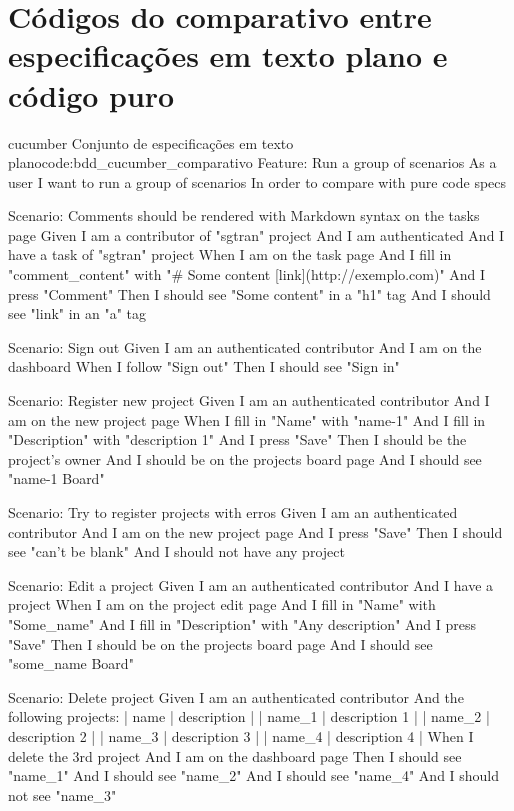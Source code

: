 \chapter{Códigos do comparativo entre especificações em texto plano e código puro} %
\label{cha:codigo_do_comparativo}

\begin{mycode}{cucumber}%
{Conjunto de especificações em texto plano}{code:bdd_cucumber_comparativo}
Feature: Run a group of scenarios
  As a user
  I want to run a group of scenarios
  In order to compare with pure code specs

  Scenario: Comments should be rendered with Markdown syntax on the tasks page
    Given I am a contributor of "sgtran" project
    And I am authenticated
    And I have a task of "sgtran" project
    When I am on the task page
    And I fill in "comment_content" with "# Some content [link](http://exemplo.com)"
    And I press "Comment"
    Then I should see "Some content" in a "h1" tag
    And I should see "link" in an "a" tag

  Scenario: Sign out
    Given I am an authenticated contributor
    And I am on the dashboard
    When I follow "Sign out"
    Then I should see "Sign in"

  Scenario: Register new project
    Given I am an authenticated contributor
    And I am on the new project page
    When I fill in "Name" with "name-1"
    And I fill in "Description" with "description 1"
    And I press "Save"
    Then I should be the project's owner
    And I should be on the projects board page
    And I should see "name-1 Board"

  Scenario: Try to register projects with erros
    Given I am an authenticated contributor
    And I am on the new project page
    And I press "Save"
    Then I should see "can't be blank"
    And I should not have any project

  Scenario: Edit a project
    Given I am an authenticated contributor
    And I have a project
    When I am on the project edit page
    And I fill in "Name" with "Some_name"
    And I fill in "Description" with "Any description"
    And I press "Save"
    Then I should be on the projects board page
    And I should see "some_name Board"

  Scenario: Delete project
    Given I am an authenticated contributor
    And the following projects:
      | name   | description   |
      | name_1 | description 1 |
      | name_2 | description 2 |
      | name_3 | description 3 |
      | name_4 | description 4 |
    When I delete the 3rd project
    And I am on the dashboard page
    Then I should see "name_1"
    And I should see "name_2"
    And I should see "name_4"
    And I should not see "name_3"


\end{mycode}
